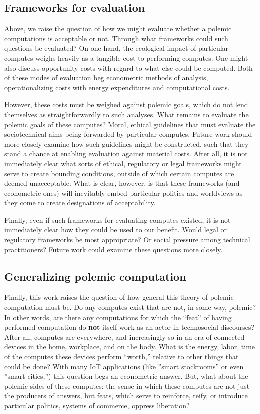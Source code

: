 \documentclass[sigconf]{acmart}
\begin{document}
\subsection{Frameworks for evaluation}
\label{sec:org9075f7a}
Above, we raise the question of how we might evaluate whether a polemic computations is acceptable or not.
Through what frameworks could such questions be evaluated? 
On one hand, the ecological impact of particular computes weighs heavily as a tangible cost to performing computes.
One might also discuss opportunity costs with regard to what else could be computed.
Both of these modes of evaluation beg econometric methods of analysis, 
operationalizing costs with energy expenditures and computational costs.

However, these costs must be weighed against polemic goals, which do not lend themselves as straightforwardly to such analyses.
What remains to evaluate the polemic goals of these computes?
Moral, ethical guidelines that must evaluate the sociotechnical aims being forwarded by particular computes. 
Future work should more closely examine how such guidelines might be constructed, such that they stand a chance at enabling evaluation against material costs.
After all, it is not immediately clear what sorts of ethical, regulatory or legal frameworks 
might serve to create bounding conditions, outside of which certain computes are deemed unacceptable.
What is clear, however, is that these frameworks (and econometric ones) will inevitably
embed particular politics and worldviews as they come to create designations of acceptability.

Finally, even if such frameworks for evaluating computes existed, it is not immediately clear how they could be used to our benefit. 
Would legal or regulatory frameworks be most appropriate?
Or social pressure among technical practitioners?
Future work could examine these questions more closely.


\subsection{Generalizing polemic computation}
\label{sec:org1bf4e9e}
Finally, this work raises the question of how general this theory of polemic computation must be.
Do any computes exist that are not, in some way, polemic?
In other words, are there any computations for which the ``feat'' of having performed computation do \textbf{not} itself work as an actor in technosocial discourses?
After all, computes are everywhere, and increasingly so in an era of connected devices in the home, workplace, and on the body. 
What is the energy, labor, time of the computes these devices perform ``worth,'' relative to other things that could be done?
With many IoT applications (like ''smart stockrooms'' or even ''smart cities,'') this question begs an econometric answer.
But, what about the polemic sides of these computes: the sense in which these computes are not just the producers of answers, but feats, which serve to reinforce, reify, or introduce particular politics, systems of commerce, oppress liberation?
\end{document}
